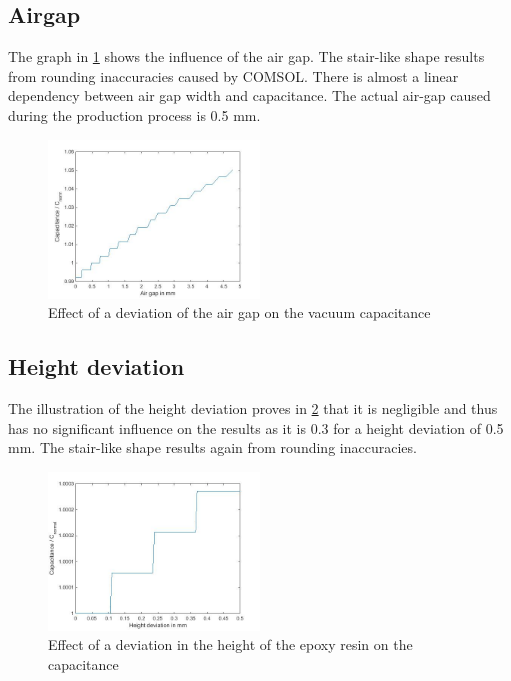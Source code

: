 \subsection{Airgap}
The graph in \ref{fig.airgap} shows the influence of the air gap. The stair-like shape results from rounding inaccuracies caused by COMSOL. There is almost a linear dependency between air gap width and capacitance. The actual air-gap caused during the production process is 0.5 mm. 

\begin{figure}[h!tb]
	\centering
	\includegraphics[width=0.5\textwidth]{figures/Results/airgap_height/airgap_graph.jpg}		
	\caption[Kurze Abbildungsbeschreibung]{Effect of a deviation of the air gap on the vacuum capacitance}
	\label{fig.airgap}
\end{figure}
 
\subsection{Height deviation}
The illustration of the height deviation proves in \ref{fig.heightdev} that it is negligible and thus has no significant influence on the results as it is 0.3 \text{\textperthousand} for  a height deviation of 0.5 mm. The stair-like shape results again from rounding inaccuracies.  
 \begin{figure}[h!tb]
	\centering
	\includegraphics[width=0.5\textwidth]{figures/Results/airgap_height/Height_deviation.jpg}		
	\caption[Kurze Abbildungsbeschreibung]{Effect of a deviation in the height of the epoxy resin on the capacitance}
	\label{fig.heightdev}
\end{figure}

